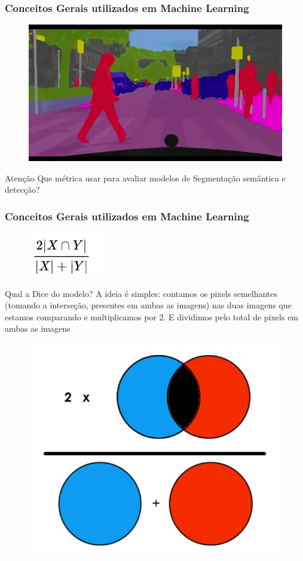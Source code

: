 \documentclass{beamer}
\begin{document}
\begin{frame}
	\frametitle{Conceitos Gerais utilizados em Machine Learning}
	\begin{figure}
		\centering
		\includegraphics[width=0.7\linewidth]{figures/segmentação}
	\end{figure}

	\begin{alertblock}{Atenção}
		Que métrica usar para avaliar modelos de Segmentação semântica e detecção?
	\end{alertblock}
\end{frame}
\begin{frame}
	\frametitle{Conceitos Gerais utilizados em Machine Learning}
	\begin{figure}
		\centering
		\includegraphics[width=0.2\linewidth]{figures/dice_formula}
	\end{figure}
	\begin{block}{Qual a Dice do modelo?}
	A ideia é simples: contamos os pixels semelhantes (tomando a interseção, presentes em ambas as imagens) nas duas imagens que estamos comparando e multiplicamos por 2. E dividimos pelo total de pixels em ambas as imagens
	\end{block}
	\begin{figure}
		\centering
		\includegraphics[width=0.3\linewidth]{figures/dice_formula1}

	\end{figure}

\end{frame}
\end{document}
